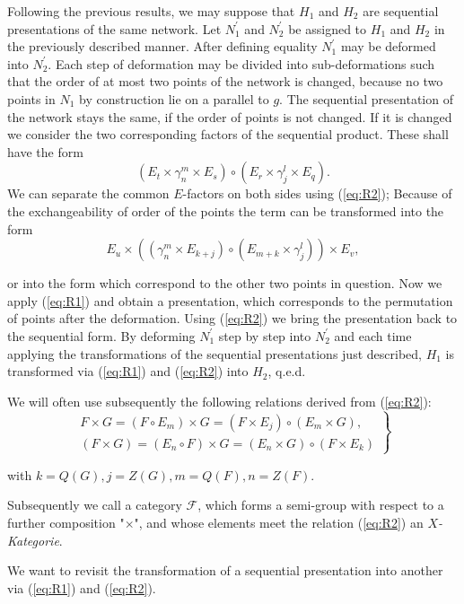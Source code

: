 \documentclass{article}
\begin{document}
Following the previous results, we may suppose that $H_1$ and $H_2$ are sequential presentations of the same network. Let $N_1^{'}$ and $N_2^{'}$ be assigned to $H_1$ and $H_2$ in the previously described manner. After defining equality $N_1^{'}$ may be deformed into $N_2^{'}$. Each step of deformation may be divided into sub-deformations such that the order of at most two points of the network is changed, because no two points in $N_1$ by construction lie on a parallel to $g$. The sequential
presentation of the network stays the same, if the order of points is not changed. If it is changed we consider the two corresponding factors of the sequential product. These shall have the form
\[
(E_t \times \gamma_n^m \times E_s) \circ (E_r \times \gamma_j^l \times E_q).
\]
We can separate the common $E$-factors on both sides using (\ref{eq:R2}); Because of the exchangeability of order of the points the term can be transformed into the form
\[
  E_u \times ((\gamma_n^m \times E_{k+j}) \circ (E_{m+k} \times \gamma_j^l)) \times E_v,
\]

or into the form which correspond to the other two points in question. Now we apply (\ref{eq:R1}) and obtain a presentation, which corresponds to the permutation of points after the deformation. Using (\ref{eq:R2}) we bring the presentation back to the sequential form. By deforming $N_1^{'}$ step by step into $N_2^{'}$ and each time applying the transformations of the sequential presentations just described, $H_1$ is transformed via (\ref{eq:R1}) and (\ref{eq:R2}) into $H_2$, q.e.d.

We will often use subsequently the following relations derived from (\ref{eq:R2}):
\begin{equation}
\label{eq:R2prime}
\tag{R2\'}
\left.
  \begin{array}{c}
  F \times G = (F \circ E_m) \times G = (F\times E_j) \circ (E_m \times G), \\
    (F \times G) = (E_n \circ F) \times G = (E_n \times G) \circ (F \times E_k)
\end{array}
\right\}
\end{equation}

with $k = Q(G), j = Z(G), m = Q(F), n = Z(F)$.

Subsequently we call a category $\mathcal{F}$, which forms a semi-group with respect to a further composition "$\times$", and whose elements meet the relation (\ref{eq:R2}) an \emph{$X$-Kategorie}. 

We want to revisit the transformation of a sequential presentation into another via (\ref{eq:R1}) and (\ref{eq:R2}).
\end{document}
